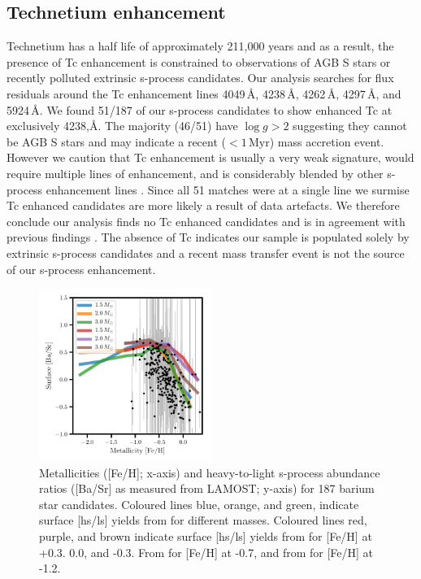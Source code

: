 \documentclass[a4paper,fleqn,usenatbib]{mnras}
\begin{document}
\subsection{Technetium enhancement}

Technetium has a half life of approximately 211,000 years and as a result, the presence of Tc enhancement is constrained to observations of AGB S stars \citep{jorissen1993} or recently polluted extrinsic s-process candidates. Our analysis searches for flux residuals around the Tc enhancement lines 4049\,\AA, 4238\,\AA, 4262\,\AA, 4297\,\AA, and 5924\,\AA. We found 51/187 of our s-process candidates to show enhanced Tc at exclusively 4238,\AA. The majority (46/51) have $\log{g} > 2$ suggesting they cannot be AGB S stars and may indicate a recent ($<1\,\textrm{Myr}$) mass accretion event. However we caution that Tc enhancement is usually a very weak signature, would require multiple lines of enhancement, and is considerably blended by other s-process enhancement lines \citep[e.g.,][]{van1999}. Since all 51 matches were at a single line we surmise Tc enhanced candidates are more likely a result of data artefacts. We therefore conclude our analysis finds no Tc enhanced candidates and is in agreement with previous findings \citep[e.g.,][]{little1987,smith1984,smith1983}. The absence of Tc indicates our sample is populated solely by extrinsic s-process candidates and a recent mass transfer event is not the source of our s-process enhancement. 

\begin{figure}
	\includegraphics[width=0.5\textwidth]{yields_test.pdf}
    \caption{Metallicities ([Fe/H]; x-axis) and heavy-to-light s-process abundance ratios ([Ba/Sr] as measured from LAMOST; y-axis) for 187 barium star candidates. Coloured lines blue, orange, and green, indicate surface [hs/ls] yields from \citet{cristallo2015} for different masses. Coloured lines red, purple, and brown indicate surface [hs/ls] yields from \citet{karakas_lugaro2016} for [Fe/H] at +0.3. 0.0, and -0.3. From \citet{karakas2018} for [Fe/H] at -0.7, and from \citet{fishlock2014} for [Fe/H] at -1.2.}
    \label{fig:figure3}
\end{figure}
\end{document}
